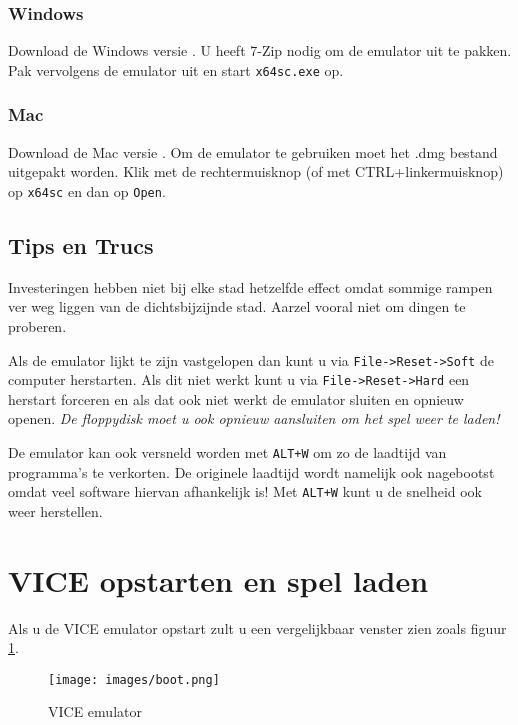 \documentclass{article}
\begin{document}
\subsubsection{Windows}
Download de Windows versie \citep{vicewindows}.
U heeft 7-Zip \citep{7zip} nodig om de emulator uit te pakken.
Pak vervolgens de emulator uit en start \verb:x64sc.exe: op.

\subsubsection{Mac}
Download de Mac versie \citep{viceosx}.
Om de emulator te gebruiken moet het .dmg bestand uitgepakt worden.
Klik met de rechtermuisknop (of met CTRL+linkermuisknop) op \verb:x64sc: en dan op \verb:Open:.

\subsection{Tips en Trucs}

Investeringen hebben niet bij elke stad hetzelfde effect omdat sommige rampen ver weg liggen van de dichtsbijzijnde stad.
Aarzel vooral niet om dingen te proberen.

Als de emulator lijkt te zijn vastgelopen dan kunt u via \verb:File->Reset->Soft: de computer herstarten.
Als dit niet werkt kunt u via \verb:File->Reset->Hard: een herstart forceren en als dat ook niet werkt de emulator sluiten en opnieuw openen.
\emph{De floppydisk moet u ook opnieuw aansluiten om het spel weer te laden!}

De emulator kan ook versneld worden met \verb:ALT+W: om zo de laadtijd van programma's te verkorten.
De originele laadtijd wordt namelijk ook nagebootst omdat veel software hiervan afhankelijk is!
Met \verb:ALT+W: kunt u de snelheid ook weer herstellen.

\section{VICE opstarten en spel laden}

Als u de VICE emulator opstart zult u een vergelijkbaar venster zien zoals figuur \ref{fig:vice}.

\begin{figure}[H]
\centering
\texttt{[image: images/boot.png]}
\caption{VICE emulator}
\label{fig:vice}
\end{figure}
\end{document}
